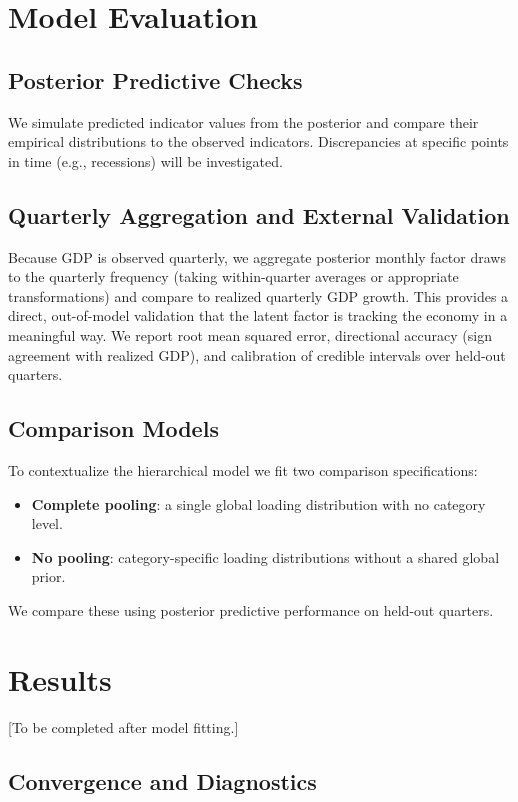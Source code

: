 \documentclass[11pt]{article}
\begin{document}
\section{Model Evaluation}

\subsection{Posterior Predictive Checks}

We simulate predicted indicator values from the posterior and compare their empirical distributions to the observed indicators. Discrepancies at specific points in time (e.g., recessions) will be investigated.

\subsection{Quarterly Aggregation and External Validation}

Because GDP is observed quarterly, we aggregate posterior monthly factor draws to the quarterly frequency (taking within-quarter averages or appropriate transformations) and compare to realized quarterly GDP growth. This provides a direct, out-of-model validation that the latent factor is tracking the economy in a meaningful way. We report root mean squared error, directional accuracy (sign agreement with realized GDP), and calibration of credible intervals over held-out quarters.

\subsection{Comparison Models}

To contextualize the hierarchical model we fit two comparison specifications:
\begin{itemize}[nosep]
  \item \textbf{Complete pooling}: a single global loading distribution with no category level.
  \item \textbf{No pooling}: category-specific loading distributions without a shared global prior.
\end{itemize}
We compare these using posterior predictive performance on held-out quarters.

\section{Results}
[To be completed after model fitting.]

\subsection{Convergence and Diagnostics}
\end{document}
